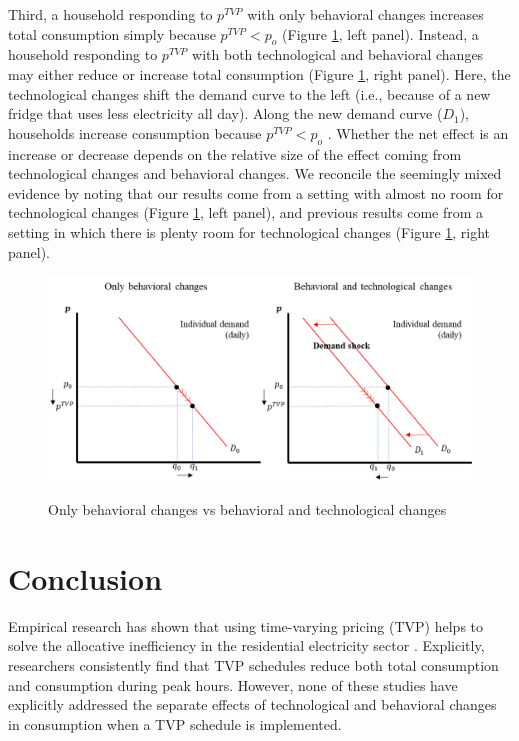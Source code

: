 \documentclass[12pt]{article}
\begin{document}
Third, a household responding to $p^{TVP}$ with only behavioral changes increases total consumption simply because $p^{TVP} <p_{o}$ (Figure \ref{fig:five}, left panel). Instead, a household responding to $p^{TVP}$ with both technological and behavioral changes may either reduce or increase total consumption (Figure \ref{fig:five}, right panel). Here, the technological changes shift the demand curve to the left (i.e., because of a new fridge that uses less electricity all day). Along the new demand curve ($D_{1}$), households increase consumption because $p^{TVP} < p_{o}$ . Whether the net effect is an increase or decrease depends on the relative size of the effect coming from technological changes and behavioral changes. We reconcile the seemingly mixed evidence by noting that our results come from a setting with almost no room for technological changes (Figure \ref{fig:five}, left panel), and previous results come from a setting in which there is plenty room for technological changes (Figure \ref{fig:five}, right panel).

\begin{figure}[ht]
  \caption{Only behavioral changes vs behavioral and technological changes}\label{fig:five}
  \begin{center}
  {\includegraphics[width=1\textwidth]{./figures/image5.png}}
  \end{center}
\end{figure}

\section{Conclusion}

Empirical research has shown that using time-varying pricing (TVP) helps to solve the allocative inefficiency in the residential electricity sector \citep{allcottRethinkingRealtimeElectricity2011,wolakResidentialCustomersRespond2011,jessoeUnderstandingRolePrice2014}. Explicitly, researchers consistently find that TVP schedules reduce both total consumption and consumption during peak hours. However, none of these studies have explicitly addressed the separate effects of technological and behavioral changes in consumption when a TVP schedule is implemented.
\end{document}
